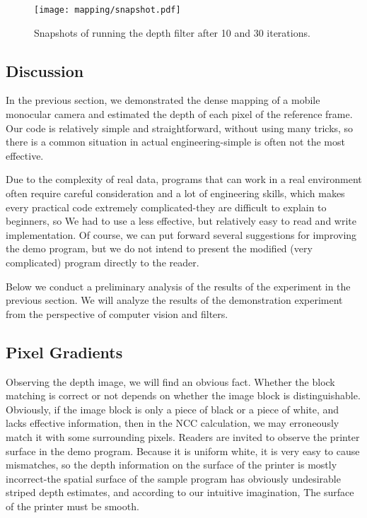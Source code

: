 \begin{figure}[!ht]
	\centering
	\texttt{[image: mapping/snapshot.pdf]}
	\caption{Snapshots of running the depth filter after 10 and 30 iterations. }
	\label{fig:snapshot}
\end{figure}

\subsection{Discussion}
In the previous section, we demonstrated the dense mapping of a mobile monocular camera and estimated the depth of each pixel of the reference frame. Our code is relatively simple and straightforward, without using many tricks, so there is a common situation in actual engineering-simple is often not the most effective.

Due to the complexity of real data, programs that can work in a real environment often require careful consideration and a lot of engineering skills, which makes every practical code extremely complicated-they are difficult to explain to beginners, so We had to use a less effective, but relatively easy to read and write implementation. Of course, we can put forward several suggestions for improving the demo program, but we do not intend to present the modified (very complicated) program directly to the reader.

Below we conduct a preliminary analysis of the results of the experiment in the previous section. We will analyze the results of the demonstration experiment from the perspective of computer vision and filters.

\subsection{Pixel Gradients}
Observing the depth image, we will find an obvious fact. Whether the block matching is correct or not depends on whether the image block is distinguishable. Obviously, if the image block is only a piece of black or a piece of white, and lacks effective information, then in the NCC calculation, we may erroneously match it with some surrounding pixels. Readers are invited to observe the printer surface in the demo program. Because it is uniform white, it is very easy to cause mismatches, so the depth information on the surface of the printer is mostly incorrect-the spatial surface of the sample program has obviously undesirable striped depth estimates, and according to our intuitive imagination, The surface of the printer must be smooth.

